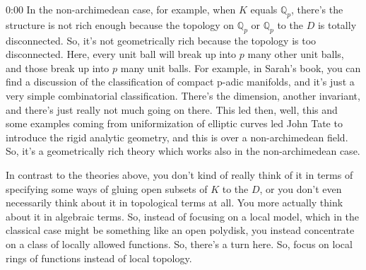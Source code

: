 \begin{unfinished}{0:00}
In the non-archimedean case, for example, when $K$ equals $\mathbb{Q}_p$, there's the structure is not rich enough because the topology on $\mathbb{Q}_p$ or $\mathbb{Q}_p$ to the $D$ is totally disconnected. So, it's not geometrically rich because the topology is too disconnected. Here, every unit ball will break up into $p$ many other unit balls, and those break up into $p$ many unit balls. For example, in Sarah's book, you can find a discussion of the classification of compact p-adic manifolds, and it's just a very simple combinatorial classification. There's the dimension, another invariant, and there's just really not much going on there. This led then, well, this and some examples coming from uniformization of elliptic curves led John Tate to introduce the rigid analytic geometry, and this is over a non-archimedean field. So, it's a geometrically rich theory which works also in the non-archimedean case. 

In contrast to the theories above, you don't kind of really think of it in terms of specifying some ways of gluing open subsets of $K$ to the $D$, or you don't even necessarily think about it in topological terms at all. You more actually think about it in algebraic terms. So, instead of focusing on a local model, which in the classical case might be something like an open polydisk, you instead concentrate on a class of locally allowed functions. So, there's a turn here. So, focus on local rings of functions instead of local topology.


\end{unfinished}
